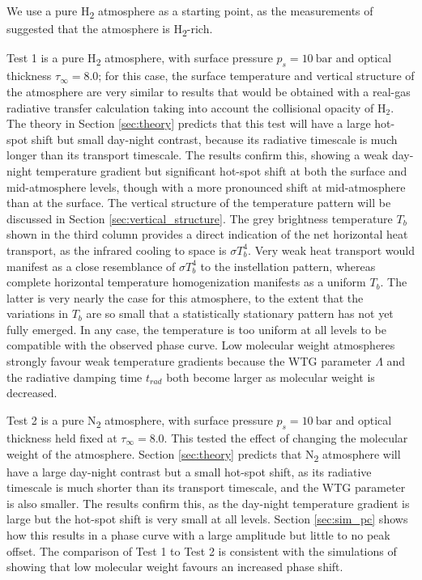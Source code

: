 We use a pure H\textsubscript{2} atmosphere as a starting point, as the measurements of  \citet{tsiaras2016detection} suggested that the atmosphere is H\textsubscript{2}-rich.

Test 1 is a pure H\textsubscript{2} atmosphere, with surface pressure $p_{s} = 10\ \mathrm{bar}$ and optical thickness $\tau_{\infty}= 8.0$; for this case, the surface temperature and vertical structure of the atmosphere are very similar to results that would be obtained with a real-gas radiative transfer calculation taking into account the collisional opacity of $\mathrm{H_2}$. The theory in Section \ref{sec:theory} predicts that this test will have a large hot-spot shift but small day-night contrast, because its radiative timescale is much longer than its transport timescale. The results confirm this, showing a weak day-night temperature gradient but significant hot-spot shift at both the surface and mid-atmosphere levels, though with a more pronounced shift at mid-atmosphere than at the surface. The vertical structure of the temperature pattern will be discussed in Section \ref{sec:vertical_structure}.  The grey brightness temperature $T_{b}$ shown in the third column provides a direct indication of the net horizontal heat transport, as the infrared cooling to space is $\sigma T_{b}^{4}$. Very weak heat transport would manifest as a close resemblance of $\sigma T_{b}^{4}$ to the instellation pattern, whereas complete horizontal temperature homogenization manifests as a uniform $T_{b}$. The latter is very nearly the case for this atmosphere, to the extent that the variations in $T_{b}$ are so small that a statistically stationary pattern has not yet fully emerged. In any case, the temperature is too uniform at all levels to be compatible with the observed phase curve.
Low molecular weight atmospheres strongly favour weak temperature gradients because the WTG parameter $\Lambda$ and the radiative damping time $t_{rad}$ both become larger as molecular weight is decreased.

Test 2 is a pure N\textsubscript{2} atmosphere, with surface pressure $p_{s} = 10\ \mathrm{bar}$ and optical thickness held fixed at $\tau_{\infty}= 8.0$. This tested the effect of changing the molecular weight of the atmosphere. Section \ref{sec:theory} predicts that N\textsubscript{2} atmosphere will have a large day-night contrast but a small hot-spot shift, as its radiative timescale is much shorter than its transport timescale, and the WTG parameter is also smaller.  The results confirm this, as the day-night temperature gradient is large but the hot-spot shift is very small at all levels. Section \ref{sec:sim_pc} shows how this results in a phase curve with a large amplitude but little to no peak offset. The comparison of Test 1 to Test 2 is consistent with the simulations of \citet{kataria2014atmospheric} showing that low molecular weight favours an increased phase shift.

